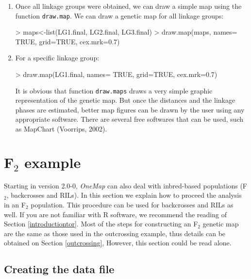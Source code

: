 \documentclass[letterpaper,12pt,oneside]{article}
\begin{document}
\begin{enumerate}

  \item Once all linkage groups were obtained, we can draw a simple map using the function {\tt draw.map}. We can draw a genetic map for all linkage groups:

\begin{Schunk}
\begin{Sinput}
> maps<-list(LG1.final, LG2.final, LG3.final)
> draw.map(maps, names= TRUE, grid=TRUE, cex.mrk=0.7)
\end{Sinput}
\end{Schunk}

\item For a specific linkage group:

\begin{Schunk}
\begin{Sinput}
> draw.map(LG1.final, names= TRUE, grid=TRUE, cex.mrk=0.7)
\end{Sinput}
\end{Schunk}

It is obvious that function {\tt draw.maps} draws a very simple graphic representation of the genetic map. But once the distances and the linkage phases are estimated, better map figures can be drawn by the user using any appropriate software. There are several free softwares that can be used, such as MapChart (Voorrips, 2002).

\end{enumerate}

\section{F$_2$ example}
\label{f2}

Starting in version 2.0-0, {\sl OneMap} can also deal with inbred-based populations (F$_2$, backcrosses and RILs). In this section we explain how to proceed the analysis in an F$_2$ population. This procedure can be used for backcrosses and RILs as well. If you are not familiar with R software, we recommend the reading of Section \ref{introductiontor}. Most of the steps for constructing an F$_2$ genetic map are the same as those used in the outcrossing example, thus details can be obtained on Section \ref{outcrossing}, However, this section could be read alone. 

\subsection{Creating the data file}
\label{createoutcross}
\end{document}

